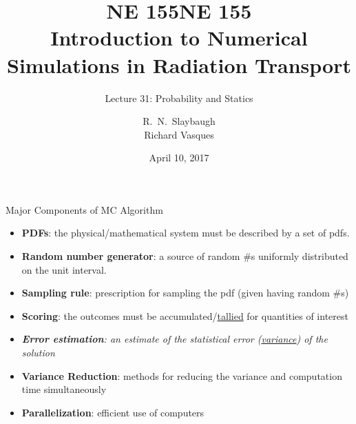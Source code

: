 \documentclass[xcolor=x11names,compress]{beamer}
\title{NE 155}
\author{R.\ N.\ Slaybaugh\\
Richard Vasques}
\date{April 10, 2017}
\renewcommand{\(}{\begin{columns}}
\renewcommand{\)}{\end{columns}}
\newcommand{\<}[1]{\begin{column}{#1}}
\renewcommand{\>}{\end{column}}
\begin{document}
\begin{frame}
\title{NE 155\\Introduction to Numerical Simulations in Radiation Transport}
\subtitle{Lecture 31: Probability and Statics}
\titlepage
\end{frame}

\begin{frame}{Major Components of MC Algorithm}

\begin{itemize}
  \item \textbf{PDFs}: the physical/mathematical system must be described by a set of pdfs.
  \pause
  \item \textbf{Random number generator}: a source of random \#s uniformly distributed on the unit interval.
  \pause
  \item \textbf{Sampling rule}: prescription for sampling the pdf (given having random \#s)
  \pause
  \item \textbf{Scoring}: the outcomes must be accumulated/\underline{tallied} for quantities of interest
  \pause
  \item \textit{\textbf{Error estimation}: an estimate of the statistical error (\underline{variance}) of the solution}
    \pause
  \item \textbf{Variance Reduction}: methods for reducing the variance and computation time simultaneously
    \pause
  \item \textbf{Parallelization}: efficient use of computers
\end{itemize}
\end{frame}
\end{document}
